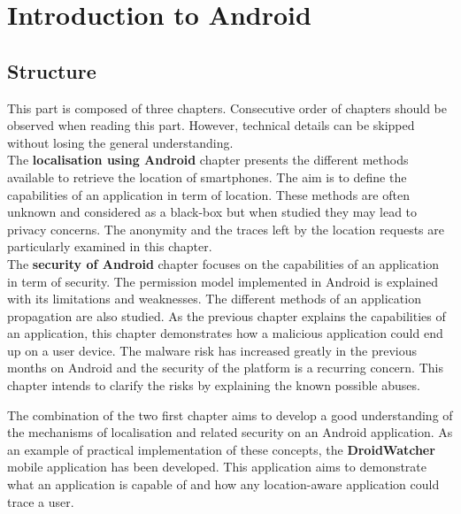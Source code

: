 
\chapter{Introduction to Android}
\label{chap:andro-intro}

\section*{Structure}
\label{sec:intro-andro-structure}
This part is composed of three chapters.
Consecutive order of chapters should be observed when reading this part.
However, technical details can be skipped without losing the general understanding.\\

The \textbf{localisation using Android} chapter presents the different methods available to retrieve the location of smartphones.
The aim is to define the capabilities of an application in term of location.
These methods are often unknown and considered as a black-box but when studied they may lead to privacy concerns.
The anonymity and the traces left by the location requests are particularly examined in this chapter.\\

The \textbf{security of Android} chapter focuses on the capabilities of an application in term of security.
The permission model implemented in Android is explained with its limitations and weaknesses.
The different methods of an application propagation are also studied.
As the previous chapter explains the capabilities of an application, this chapter demonstrates how a malicious application could end up on a user device.
The malware risk has increased greatly in the previous months on Android and the security of the platform is a recurring concern.
This chapter intends to clarify the risks by explaining the known possible abuses.

The combination of the two first chapter aims to develop a good understanding of the mechanisms of localisation and related security on an Android application.
As an example of practical implementation of these concepts, the \textbf{DroidWatcher} mobile application has been developed.
This application aims to demonstrate what an application is capable of and how any location-aware application could trace a user.

